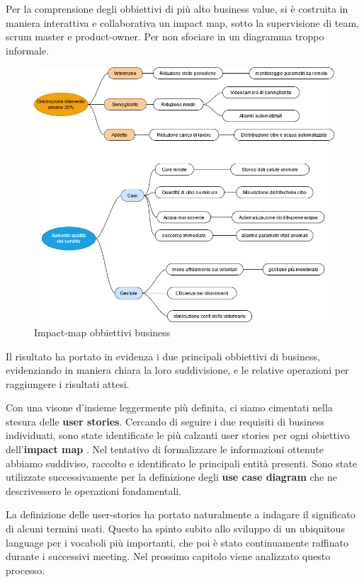 	Per la comprensione degli obbiettivi di più alto business value, si è costruita in maniera interattiva e collaborativa un impact map, sotto la supervisione di team, scrum master e product-owner. Per non sfociare in un diagramma troppo informale.
	\begin{figure}[ht]
        \caption{Impact-map obbiettivi business}
        \centering
        \includegraphics[width=1\textwidth]{DrawIo/impactMap.png}
    \end{figure}

    Il risultato ha portato in evidenza i due principali obbiettivi di business, evidenziando in maniera chiara la loro suddivisione, e le relative operazioni per raggiungere i risultati attesi.
    
    Con una visone d'insieme leggermente più definita, ci siamo cimentati nella stesura delle \textbf{user stories}. Cercando di seguire i due requisiti di business individuati, sono state identificate le più calzanti user stories per ogni obiettivo  dell'\textbf{impact map}
    .
    Nel tentativo di formalizzare le informazioni ottenute abbiamo suddiviso, raccolto e identificato le principali entità presenti. Sono state utilizzate successivamente per la definizione degli \textbf{use case diagram} che ne descrivessero le operazioni fondamentali.

	La definizione delle user-stories ha portato naturalmente a indagare il significato di alcuni termini usati. Questo ha spinto subito allo sviluppo di un ubiquitous language per i vocaboli più importanti, che poi è stato continuamente raffinato durante i successivi meeting. 
	Nel prossimo capitolo viene analizzato questo processo. 
    
